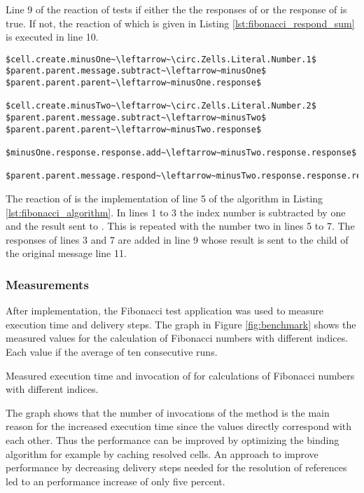 Line 9 of the reaction of  tests if either the the responses of  or the response of  is true. If not, the reaction of  which is given in Listing \ref{lst:fibonacci_respond_sum} is executed in line 10.

\begin{lstlisting}[mathescape, float=hbt, label=lst:fibonacci_respond_sum, 
caption=Reaction of \cell{Fibonacci.respondSum} cell]
$cell.create.minusOne~\leftarrow~\circ.Zells.Literal.Number.1$
$parent.parent.message.subtract~\leftarrow~minusOne$
$parent.parent.parent~\leftarrow~minusOne.response$

$cell.create.minusTwo~\leftarrow~\circ.Zells.Literal.Number.2$
$parent.parent.message.subtract~\leftarrow~minusTwo$
$parent.parent.parent~\leftarrow~minusTwo.response$

$minusOne.response.response.add~\leftarrow~minusTwo.response.response$

$parent.parent.message.respond~\leftarrow~minusTwo.response.response.response$
\end{lstlisting}

The reaction of  is the implementation of line 5 of the algorithm in Listing \ref{lst:fibonacci_algorithm}. In lines 1 to 3 the index number is subtracted by one and the result sent to . This is repeated with the number two in lines 5 to 7. The responses of lines 3 and 7 are added in line 9 whose result is sent to the  child of the original message line 11.

\subsubsection{Measurements}

After implementation, the Fibonacci test application was used to measure execution time and delivery steps. The graph in Figure \ref{fig:benchmark} shows the measured values for the calculation of Fibonacci numbers with different indices. Each value if the average of ten consecutive runs. 

{Measured execution time and invocation of  for calculations of Fibonacci numbers with different indices.}

The graph shows that the number of invocations of the  method is the main reason for the increased execution time since the values directly correspond with each other. Thus the performance can be improved by optimizing the binding algorithm for example by caching resolved cells. An approach to improve performance by decreasing delivery steps needed for the resolution of  references led to an performance increase of only five percent.
